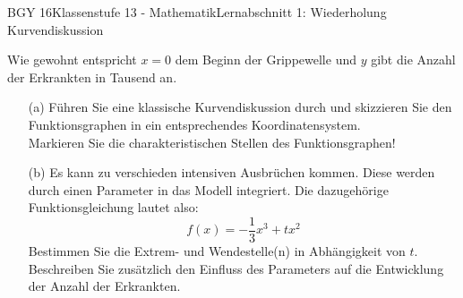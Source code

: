 \documentclass[oneside,openany,headings=optiontotoc,11pt,numbers=noenddot]{scrreprt}
\begin{document}
\begin{worksheet}{BGY 16}{Klassenstufe 13 - Mathematik}{Lernabschnitt 1: Wiederholung Kurvendiskussion}
\begin{framed}
			Wie gewohnt entspricht \(x = 0\) dem Beginn der Grippewelle und \(y\) gibt die Anzahl der Erkrankten in Tausend an.
		\end{framed}
		\begin{itemize}
			\item[(a)] Führen Sie eine klassische Kurvendiskussion durch und skizzieren Sie den Funktionsgraphen in ein entsprechendes Koordinatensystem.\\
			Markieren Sie die charakteristischen Stellen des Funktionsgraphen!
			\item[(b)] Es kann zu verschieden intensiven Ausbrüchen kommen. Diese werden durch einen Parameter in das Modell integriert. Die dazugehörige Funktionsgleichung lautet also:
			\[f(x) = -\frac{1}{3}x^3 +tx^2\]
			Bestimmen Sie die Extrem- und Wendestelle(n) in Abhängigkeit von \(t\).\\
			Beschreiben Sie zusätzlich den Einfluss des Parameters auf die Entwicklung der Anzahl der Erkrankten.
		\end{itemize}
	\end{worksheet}
\end{document}
